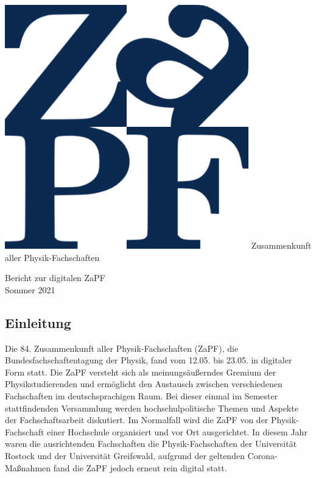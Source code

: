 \documentclass{scrartcl}
\begin{document}
	\hspace{0.74\textwidth}
	\begin{minipage}{0.25\textwidth}
		\vspace{-1cm}
		\centering
		\includegraphics[width=.89\textwidth]{logo.png}
		\small Zusammenkunft aller Physik-Fachschaften
	\end{minipage}
	
	\begin{center}
		\vspace{1.5cm}
		\huge{Bericht zur digitalen ZaPF \\ Sommer 2021}
		\vspace{1cm}
	\end{center}

\subsection*{Einleitung}

Die 84. Zusammenkunft aller Physik-Fachschaften (ZaPF), die Bundesfachschaftentagung der Physik, fand vom 12.05. bis 23.05. in digitaler Form statt. Die ZaPF versteht sich als meinungsäußerndes Gremium der Physikstudierenden und ermöglicht den Austausch zwischen verschiedenen Fachschaften im deutschsprachigen Raum. Bei dieser einmal im Semester stattfindenden Versammlung werden hochschulpolitische Themen und Aspekte der Fachschaftsarbeit diskutiert. Im Normalfall wird die ZaPF von der Physik-Fachschaft einer Hochschule organisiert und vor Ort ausgerichtet. In diesem Jahr waren die ausrichtenden Fachschaften die Physik-Fachschaften der Universität Rostock und der Universität Greifswald, aufgrund der geltenden Corona-Maßnahmen fand die ZaPF jedoch erneut rein digital statt.
\end{document}
